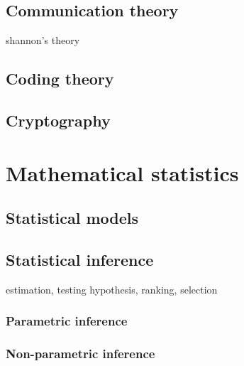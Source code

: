 \documentclass{../../large}
\begin{document}
\chapter{Communication theory}
shannon's theory
\chapter{Coding theory}
\chapter{Cryptography}





\part{Mathematical statistics}
\chapter{Statistical models}
\chapter{Statistical inference}
estimation, testing hypothesis, ranking, selection
\section{Parametric inference}
\section{Non-parametric inference}


\chapter{}
\end{document}
